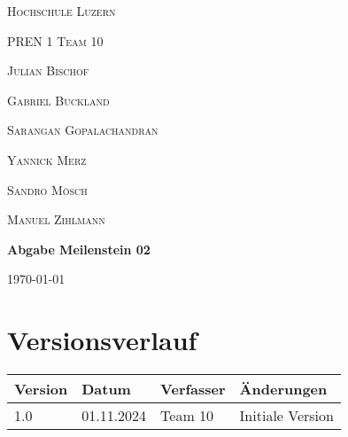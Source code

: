 \documentclass{scrarticle}                %
\newcommand{\Abgabenummer}{02}
\begin{document}

\begin{titlepage}
    \centering
    {\scshape\LARGE Hochschule Luzern \par}
    \vspace{1cm}
    {\scshape\Large PREN 1 Team 10\par}
    \vspace{1cm}

    {\scshape\large Julian Bischof\par}
    {\scshape\large Gabriel Buckland\par}
    {\scshape\large Sarangan Gopalachandran \par}
    {\scshape\large Yannick Merz\par}
    {\scshape\large Sandro Mösch\par}
    {\scshape\large Manuel Zihlmann\par}

    \vspace{1.5cm}
    {\huge\bfseries Abgabe Meilenstein \Abgabenummer \par}

    \vfill
    {\large \today\par}
\end{titlepage}

\newpage


\section*{Versionsverlauf}

\thispagestyle{nofooter}

\begin{longtable}{|p{2cm}|p{3cm}|p{3cm}|p{5cm}|}
    \hline
    \textbf{Version} & \textbf{Datum} & \textbf{Verfasser} & \textbf{Änderungen} \\
    \hline
    1.0              & 01.11.2024       & Team 10               & Initiale Version          \\
    \hline
\end{longtable}
\end{document}
